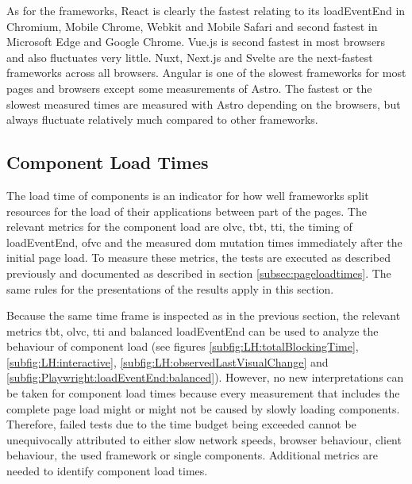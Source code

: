 \documentclass[a4paper, 10pt]{article}
\begin{document}
As for the frameworks, React is clearly the fastest relating to its loadEventEnd in Chromium, Mobile Chrome, Webkit and Mobile Safari and second fastest in Microsoft Edge and Google Chrome.
Vue.js is second fastest in most browsers and also fluctuates very little. Nuxt, Next.js and Svelte are the next-fastest frameworks across all browsers.
Angular is one of the slowest frameworks for most pages and browsers except some measurements of Astro.
The fastest or the slowest measured times are measured with Astro depending on the browsers, but always fluctuate relatively much compared to other frameworks.


\subsection{Component Load Times}\label{subsec:componentloadtimes}

The load time of components is an indicator for how well frameworks split resources for the load of their applications between part of the pages.
The relevant metrics for the component load are \acrfull{olvc}, \acrfull{tbt}, \acrfull{tti}, the timing of loadEventEnd, \acrfull{ofvc} and the measured \acrshort{dom} mutation times immediately after the initial page load.
To measure these metrics, the tests are executed as described previously and documented as described in section \ref{subsec:pageloadtimes}.
The same rules for the presentations of the results apply in this section.

Because the same time frame is inspected as in the previous section, the relevant metrics \acrshort{tbt}, \acrshort{olvc}, \acrshort{tti} and balanced loadEventEnd can be used to analyze the behaviour of component load (see figures \ref{subfig:LH:totalBlockingTime}, \ref{subfig:LH:interactive}, \ref{subfig:LH:observedLastVisualChange} and \ref{subfig:Playwright:loadEventEnd:balanced}).
However, no new interpretations can be taken for component load times because every measurement that includes the complete page load might or might not be caused by slowly loading components.
Therefore, failed tests due to the time budget being exceeded cannot be unequivocally attributed to either slow network speeds, browser behaviour, client behaviour, the used framework or single components.
Additional metrics are needed to identify component load times.
\end{document}
